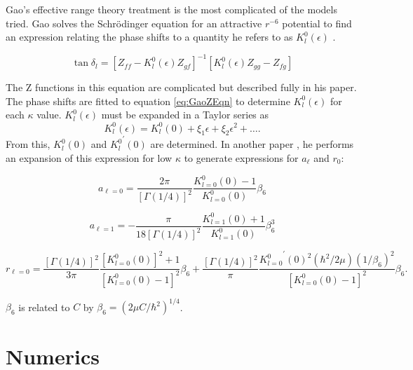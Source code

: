 \documentclass[preprint,showpacs,preprintnumbers,amsmath,amssymb]{revtex4}
\newcommand{\todoi}{\todo[inline]}
\begin{document}
Gao's effective range theory treatment is the most complicated of the models tried. Gao solves the Schr\"{o}dinger equation for an attractive $r^{-6}$ potential to find an expression relating the phase shifts to a quantity he refers to as $K_l^0(\epsilon)$ \cite{Gao1998}.

\begin{equation}
\label{eq:GaoZEqn}
\tan\delta_l = [Z_{ff} - K_l^0(\epsilon) Z_{gf}]^{-1} [K_l^0(\epsilon) Z_{gg} - Z_{fg}]
\end{equation}

\noindent The Z functions in this equation are complicated but described fully in his paper. The phase shifts are fitted to equation \ref{eq:GaoZEqn} to determine $K_l^0(\epsilon)$ for each $\kappa$ value. $K_l^0(\epsilon)$ must be expanded in a Taylor series as
\begin{equation}
\label{eq:GaoKTaylor}
K_l^0(\epsilon) = K_l^0(0) + \xi_1 \epsilon + \xi_2 \epsilon^2 + \ldots.
\end{equation}
From this, $K_l^0(0)$ and ${K_l^0}^\prime(0)$ are determined. In another paper \cite{Gao1998a}, he performs an expansion of this expression for low $\kappa$ to generate expressions for $a_\ell$ and $r_0$:

\begin{equation}
\label{eq:GaoScatLenS}
a_{\ell=0} = \frac{2\pi}{[\Gamma(1/4)]^2} \frac{K_{l=0}^0(0) - 1}{K_{l=0}^0(0)} \beta_6
\end{equation}

\begin{equation}
\label{eq:GaoScatLenP}
a_{\ell=1} = -\frac{\pi}{18[\Gamma(1/4)]^2} \frac{K_{l=1}^0(0) + 1}{K_{l=1}^0(0)} \beta_6^3
\end{equation}

\begin{equation}
\label{eq:GaoEffRange}
r_{\ell=0} = \frac{[\Gamma(1/4)]^2}{3\pi} \frac{[K_{l=0}^0(0)]^2 + 1}{[K_{l=0}^0(0) - 1]^2} \beta_6 + \frac{[\Gamma(1/4)]^2}{\pi} \frac{{K_{l=0}^0}^\prime(0)^2(\hbar^2/2\mu)(1/\beta_6)^2}{[K_{l=0}^0(0) - 1]^2} \beta_6.
\end{equation}

$\beta_6$ is related to $C$ by $\beta_6 = (2\mu C/\hbar^2)^{1/4}$.


\section{Numerics}
\label{sec:Numerical}
\end{document}
